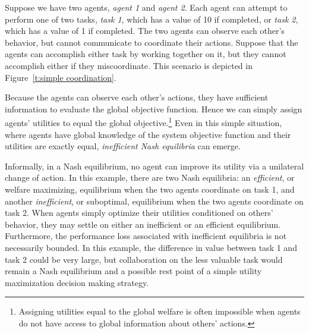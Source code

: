 \begin{example}\label{e:interdependent utilities}
Suppose we have two agents, {\it agent 1} and {\it agent 2}. Each agent can attempt to perform one of two tasks, {\it task 1}, which has a value of 10 if completed, or {\it task 2}, which has a value of 1 if completed.  The two agents can observe each other's behavior, but cannot communicate to coordinate their actions. Suppose that the agents can accomplish either task by working together on it, but they cannot accomplish either if they miscoordinate. This scenario is depicted in Figure~\ref{t:simple coordination}.

Because the agents can observe each other's actions, they have sufficient information to evaluate the global objective function. Hence we can simply assign agents' utilities to equal the global objective.\footnote{Assigning utilities equal to the global welfare is often impossible when agents do not have access to global information about others' actions.} Even in this simple situation, where agents have global knowledge of the system objective function and their utilities are exactly equal, {\it inefficient Nash equilibria} can emerge.

Informally, in a Nash equilibrium, no agent can improve its utility via a unilateral change of action. In this example, there are two Nash equilibria: an {\it efficient}, or welfare maximizing, equilibrium when the two agents coordinate on task 1, and another {\it inefficient}, or suboptimal, equilibrium when the two agents coordinate on task 2. When agents simply optimize their utilities conditioned on others' behavior, they may settle on either an inefficient or an efficient equilibrium. Furthermore, the performance loss associated with inefficient equilibria is not necessarily bounded. In this example, the difference in value between task 1 and task 2 could be very large, but collaboration on the less valuable task would remain a Nash equilibrium and a possible rest point of a simple utility maximization decision making strategy.




\end{example}
